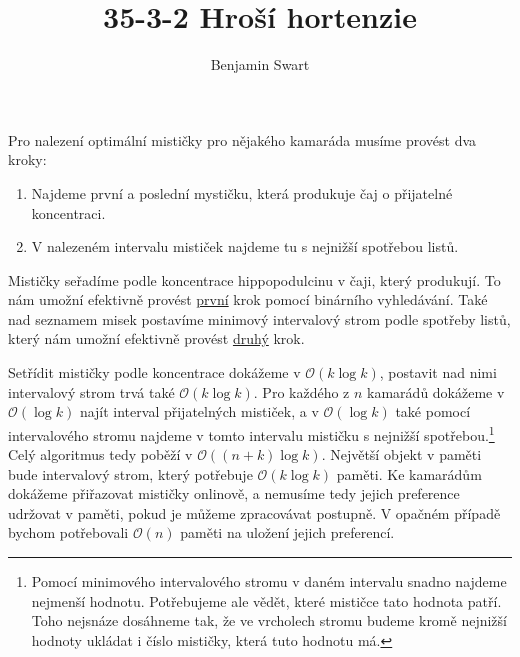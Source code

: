 \documentclass{article}
\title{35-3-2 Hroší hortenzie}
\author{Benjamin Swart}
\begin{document}
\maketitle

Pro nalezení optimální mističky pro nějakého kamaráda musíme provést dva kroky:

\begin{enumerate}
        \item \label{step-one} Najdeme první a poslední mystičku, která produkuje čaj o přijatelné koncentraci.
        \item \label{step-two} V nalezeném intervalu mističek najdeme tu s nejnižší spotřebou listů.
\end{enumerate}

Mističky seřadíme podle koncentrace hippopodulcinu v čaji, který produkují. To nám umožní efektivně provést \hyperref[step-one]{první} krok pomocí binárního vyhledávání. Také nad seznamem misek postavíme minimový intervalový strom podle spotřeby listů, který nám umožní efektivně provést \hyperref[step-two]{druhý} krok.

Setřídit mističky podle koncentrace dokážeme v $\mathcal{O}(k\log k)$, postavit nad nimi intervalový strom trvá také $\mathcal{O}(k\log k)$. Pro každého z $n$ kamarádů dokážeme v $\mathcal{O}(\log k)$ najít interval přijatelných mističek, a v $\mathcal{O}(\log k)$ také pomocí intervalového stromu najdeme v tomto intervalu mističku s nejnižší spotřebou.\footnote{Pomocí minimového intervalového stromu v daném intervalu snadno najdeme nejmenší hodnotu. Potřebujeme ale vědět, které mističce tato hodnota patří. Toho nejsnáze dosáhneme tak, že ve vrcholech stromu budeme kromě nejnižší hodnoty ukládat i číslo mističky, která tuto hodnotu má.} Celý algoritmus tedy poběží v $\mathcal{O}((n + k) \log k)$. Největší objekt v paměti bude intervalový strom, který potřebuje $\mathcal{O}(k\log k)$ paměti. Ke kamarádům dokážeme přiřazovat mističky onlinově, a nemusíme tedy jejich preference udržovat v paměti, pokud je můžeme zpracovávat postupně. V opačném případě bychom potřebovali $\mathcal{O}(n)$ paměti na uložení jejich preferencí.
\end{document}
